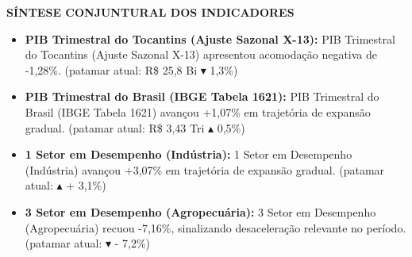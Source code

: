 \documentclass[10pt,a4paper]{article}
\begin{document}
\vspace{0.04cm}
\par\vspace{0.05cm}
\par\vspace{4pt}
{\fontsize{7.8}{9.4}\selectfont\bfseries\color{corprimaria}\MakeUppercase{Síntese Conjuntural dos Indicadores}}\par\vspace{2pt}
{\scriptsize\color{cinzatexto}
\begin{itemize}[leftmargin=10pt, itemsep=1.2pt, topsep=1pt, parsep=0pt]
   \item \textbf{\color{corprimaria}PIB Trimestral do Tocantins (Ajuste Sazonal X-13):} PIB Trimestral do Tocantins (Ajuste Sazonal X-13) apresentou acomodação negativa de -1,28\%. (patamar atual: R\$ 25,8 Bi $\blacktriangledown$ 1,3\%)
   \item \textbf{\color{corprimaria}PIB Trimestral do Brasil (IBGE Tabela 1621):} PIB Trimestral do Brasil (IBGE Tabela 1621) avançou +1,07\% em trajetória de expansão gradual. (patamar atual: R\$ 3,43 Tri $\blacktriangle$ 0,5\%)
   \item \textbf{\color{corprimaria}1\textordmasculine{} Setor em Desempenho (Indústria):} 1\textordmasculine{} Setor em Desempenho (Indústria) avançou +3,07\% em trajetória de expansão gradual. (patamar atual: $\blacktriangle$ + 3,1\%)
   \item \textbf{\color{corprimaria}3\textordmasculine{} Setor em Desempenho (Agropecuária):} 3\textordmasculine{} Setor em Desempenho (Agropecuária) recuou -7,16\%, sinalizando desaceleração relevante no período. (patamar atual: $\blacktriangledown$ - 7,2\%)
\end{itemize}
}
\par\vspace{0.05cm}
\end{document}

